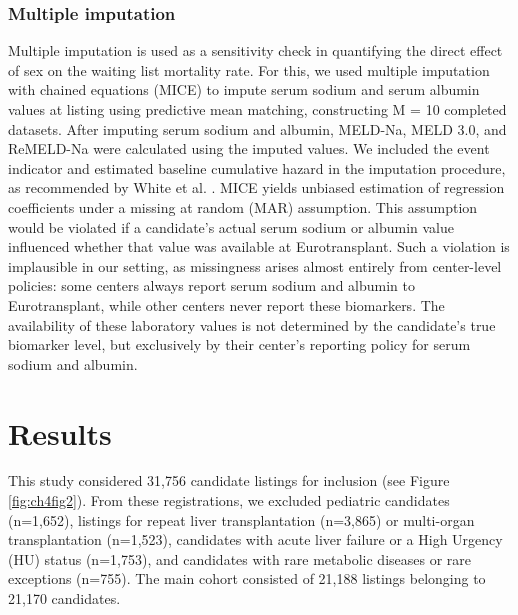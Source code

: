\documentclass[11pt,twoside,]{book}
\begin{document}
\subsubsection{Multiple imputation}\label{multiple-imputation}

Multiple imputation is used as a sensitivity check in quantifying the direct
effect of sex on the waiting list mortality rate. For this, we used multiple
imputation with chained equations (MICE) to impute serum sodium and serum albumin values at
listing using predictive mean matching, constructing M = 10 completed datasets.
After imputing serum sodium and albumin, MELD-Na, MELD 3.0, and ReMELD-Na were
calculated using the imputed values. We included the event indicator
and estimated baseline cumulative hazard in the imputation procedure, as
recommended by White et al. \citep{whiteMultipleImputationUsing2011}.
MICE yields unbiased estimation of regression coefficients under a missing at
random (MAR) assumption. This assumption would be violated if a candidate's actual serum sodium or albumin value influenced whether that value was available at Eurotransplant. Such a violation is implausible in our setting, as missingness arises almost entirely from center-level policies: some centers always report serum sodium and albumin to Eurotransplant, while other centers never report these biomarkers. The availability of these laboratory values is not determined by the candidate's true biomarker level, but exclusively by their center's reporting policy for serum sodium and albumin.

\section{Results}\label{results-1}

This study considered 31,756 candidate listings for inclusion
(see Figure \ref{fig:ch4fig2}). From these registrations, we excluded pediatric candidates (n=1,652), listings for repeat liver transplantation (n=3,865) or multi-organ transplantation (n=1,523),
candidates with acute liver failure or a High Urgency (HU) status (n=1,753), and candidates
with rare metabolic diseases or rare exceptions (n=755). The main cohort
consisted of 21,188 listings belonging to 21,170 candidates.
\end{document}
